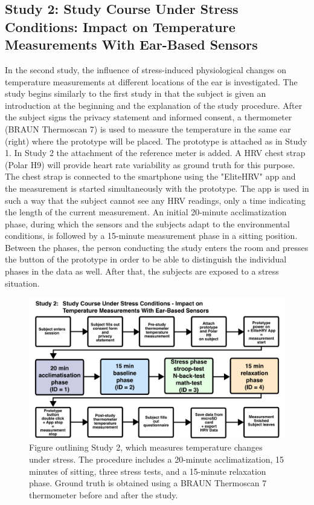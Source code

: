\subsection{Study 2: Study Course Under Stress Conditions: Impact on Temperature Measurements With Ear-Based Sensors}
\label{ch:Design:Study:Study2}
In the second study, the influence of stress-induced physiological changes on temperature measurements at different locations of the ear is investigated. 
The study begins similarly to the first study in that the subject is given an introduction at the beginning and the explanation of the study procedure.
After the subject signs the privacy statement and informed consent, a thermometer (BRAUN Thermoscan 7) is used to measure the temperature in the same ear (right) where the prototype will be placed.
The prototype is attached as in Study 1.
In Study 2 the attachment of the reference meter is added.
A HRV chest strap (Polar H9) will provide heart rate variability as ground truth for this purpose.
The chest strap is connected to the smartphone using the "EliteHRV" app and the measurement is started simultaneously with the prototype.
The app is used in such a way that the subject cannot see any HRV readings, only a time indicating the length of the current measurement.
An initial 20-minute acclimatization phase, during which the sensors and the subjects adapt to the environmental conditions, is followed by a 15-minute measurement phase in a sitting position.
Between the phases, the person conducting the study enters the room and presses the button of the prototype in order to be able to distinguish the individual phases in the data as well.
After that, the subjects are exposed to a stress situation. 
\begin{figure}[!t]
    \centering
    \includegraphics[width=\textwidth]{thesis-doc/images/study2/Procedure2.pdf}
    \caption{Figure outlining Study 2, which measures temperature changes under stress. The procedure includes a 20-minute acclimatization, 15 minutes of sitting, three stress tests, and a 15-minute relaxation phase. Ground truth is obtained using a BRAUN Thermoscan 7 thermometer before and after the study.}
    \label{fig:design:study2:procedure}
\end{figure}
